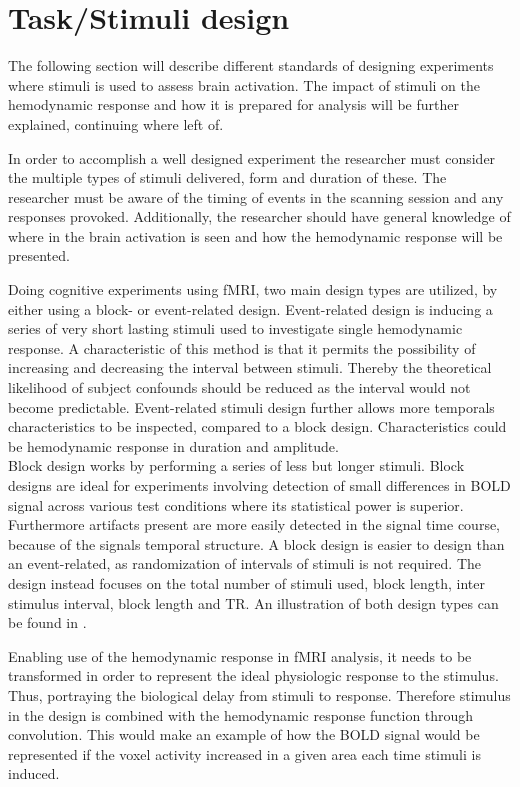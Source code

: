 \section{Task/Stimuli design} \label{sec:Stim}

The following section will describe different standards of designing experiments where stimuli is used to assess brain activation. The impact of stimuli on the hemodynamic response and how it is prepared for analysis will be further explained, continuing where  left of.

In order to accomplish a well designed experiment the researcher must consider the multiple types of stimuli delivered, form and duration of these. The researcher must be aware of the timing of events in the scanning session and any responses provoked. Additionally, the researcher should have general knowledge of where in the brain activation is seen and how the hemodynamic response will be presented.\cite{Moayedi2018} 

Doing cognitive experiments using fMRI, two main design types are utilized, by either using a block- or event-related design.   
Event-related design is inducing a series of very short lasting stimuli used to investigate single hemodynamic response. A characteristic of this method is that it permits the possibility of increasing and decreasing the interval between stimuli. Thereby the theoretical likelihood of subject confounds should be reduced as the interval would not become predictable. Event-related stimuli design further allows more temporals characteristics to be inspected, compared to a block design. Characteristics could be hemodynamic response in duration and amplitude. \cite{Chee2003}  \\
Block design works by performing a series of less but longer stimuli. Block designs are ideal for experiments involving detection of small differences in BOLD signal across various test conditions where its statistical power is superior. Furthermore artifacts present are more easily detected in the signal time course, because of the signals temporal structure. A block design is easier to design than an event-related, as randomization of intervals of stimuli is not required. The design instead focuses on the total number of stimuli used, block length, inter stimulus interval, block length and TR. An illustration of both design types can be found in . \cite{Chee2003}       

Enabling use of the hemodynamic response in fMRI analysis, it needs to be transformed in order to represent the ideal physiologic response to the stimulus. Thus, portraying the biological delay from stimuli to response. Therefore stimulus in the design is combined with the hemodynamic response function through convolution. This would make an example of how the BOLD signal would be represented if the voxel activity increased in a given area each time stimuli is induced. \cite{Moayedi2018}

